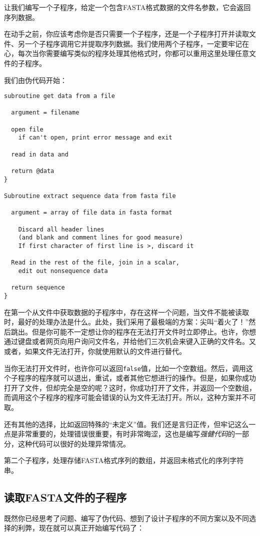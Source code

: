 让我们编写一个子程序，给定一个包含FASTA格式数据的文件名参数，它会返回序列数据。

在动手之前，你应该考虑你是否只需要一个子程序，还是一个子程序打开并读取文件、另一个子程序调用它并提取序列数据。我们使用两个子程序，一定要牢记在心，每次当你需要编写类似的程序处理其他格式时，你都可以重用这里处理任意文件的子程序。

我们由伪代码开始：

\begin{lstlisting}
subroutine get data from a file

  argument = filename

  open file
    if can't open, print error message and exit

  read in data and 

  return @data
}

Subroutine extract sequence data from fasta file

  argument = array of file data in fasta format

    Discard all header lines
    (and blank and comment lines for good measure)
    If first character of first line is >, discard it

  Read in the rest of the file, join in a scalar,
    edit out nonsequence data

  return sequence
}
\end{lstlisting}

在第一个从文件中获取数据的子程序中，存在这样一个问题，当文件不能被读取时，最好的处理办法是什么。此处，我们采用了最极端的方案：尖叫“着火了！”然后跳出。但是你可能不一定想让你的程序在无法打开文件时立即停止。也许，你想通过键盘或者网页向用户询问文件名，并给他们三次机会来键入正确的文件名。又或者，如果文件无法打开，你就使用默认的文件进行替代。

当你无法打开文件时，也许你可以返回\verb|false|值，比如一个空数组。然后，调用这个子程序的程序就可以退出，重试，或者其他它想进行的操作。但是，如果你成功打开了文件，但却完全是空的呢？这时，你成功打开了文件，并返回一个空数组，而调用这个子程序的程序可能会错误的认为文件无法打开。所以，这种方案并不可取。

还有其他的选择，比如返回特殊的“未定义”值。我们还是言归正传，但牢记这么一点是非常重要的，处理错误很重要，有时非常晦涩，这也是编写\textit{强健代码}的一部分，这种代码可以很好的处理异常情况。

第二个子程序，处理存储FASTA格式序列的数组，并返回未格式化的序列字符串。

\subsection{读取FASTA文件的子程序}
既然你已经思考了问题、编写了伪代码、想到了设计子程序的不同方案以及不同选择的利弊，现在就可以真正开始编写代码了：

